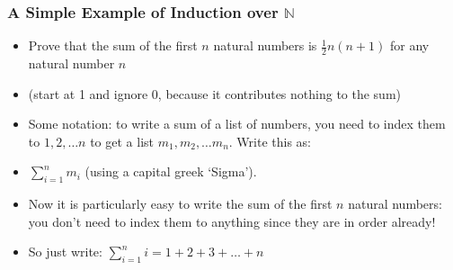 \begin{frame}
\frametitle{A Simple Example of Induction over $\mathbb{N}$}

\begin{itemize}[<+->]

\item Prove that the sum of the first $n$ natural numbers is $\frac{1}{2}n(n+1)$ for any natural number $n$

\bi
\item (start at 1 and ignore 0, because it contributes nothing to the sum) 
\ei


\item Some notation: to write a sum of a list of numbers, you need to index them to $1, 2, \ldots n$ to get a list $m_1, m_2, \ldots m_n$. Write this as:

\item $\displaystyle\sum_{i=1}^n m_i$  (using a capital greek `Sigma').\\[2ex]

\item Now it is particularly easy to write the sum of the first $n$ natural numbers: you don't need to index them to anything since they are in order already! 

\medskip

\item So just write: $\displaystyle\sum_{i=1}^n i = 1 + 2 + 3 + \ldots + n$

\end{itemize} 
\end{frame}

